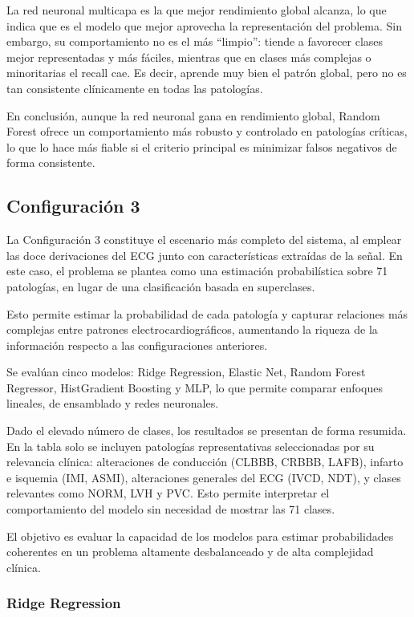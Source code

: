 \documentclass[12pt,a4paper,twoside]{book}
\begin{document}
La red neuronal multicapa es la que mejor rendimiento global alcanza, lo que indica que es el modelo que mejor aprovecha la representación del problema. 
Sin embargo, su comportamiento no es el más “limpio”: tiende a favorecer clases mejor representadas y más fáciles, mientras que en clases más complejas o minoritarias el recall cae. 
Es decir, aprende muy bien el patrón global, pero no es tan consistente clínicamente en todas las patologías.

En conclusión, aunque la red neuronal gana en rendimiento global, Random Forest ofrece un comportamiento más robusto y controlado en patologías críticas, lo que lo hace más fiable si el criterio principal es minimizar falsos negativos de forma consistente.

\subsection{Configuración 3}

La Configuración 3 constituye el escenario más completo del sistema, al emplear las doce derivaciones del ECG junto con características extraídas de la señal. 
En este caso, el problema se plantea como una estimación probabilística sobre 71 patologías, en lugar de una clasificación basada en superclases.

Esto permite estimar la probabilidad de cada patología y capturar relaciones más complejas entre patrones electrocardiográficos, aumentando la riqueza de la información respecto a las configuraciones anteriores.

Se evalúan cinco modelos: Ridge Regression, Elastic Net, Random Forest Regressor, HistGradient Boosting y MLP, lo que permite comparar enfoques lineales, de ensamblado y redes neuronales.

Dado el elevado número de clases, los resultados se presentan de forma resumida. En la tabla solo se incluyen patologías representativas seleccionadas por su relevancia clínica: alteraciones de conducción (CLBBB, CRBBB, LAFB), infarto e isquemia (IMI, ASMI), alteraciones generales del ECG (IVCD, NDT), y clases relevantes como NORM, LVH y PVC. Esto permite interpretar el comportamiento del modelo sin necesidad de mostrar las 71 clases.

El objetivo es evaluar la capacidad de los modelos para estimar probabilidades coherentes en un problema altamente desbalanceado y de alta complejidad clínica.

\subsubsection*{Ridge Regression}
\end{document}
